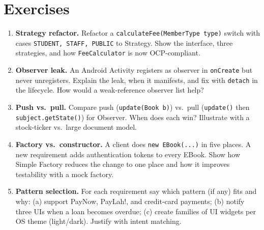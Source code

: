 \section{Exercises}
\label{sec:ch06-exercises}
\begin{enumerate}[label=E6.\arabic*, leftmargin=*, itemsep=0.8em]
    \item \textbf{Strategy refactor.} Refactor a \texttt{calculateFee(MemberType type)} switch with cases \texttt{STUDENT, STAFF, PUBLIC} to Strategy. Show the interface, three strategies, and how \texttt{FeeCalculator} is now OCP-compliant.
    \item \textbf{Observer leak.} An Android Activity registers as observer in \texttt{onCreate} but never unregisters. Explain the leak, when it manifests, and fix with \texttt{detach} in the lifecycle. How would a weak-reference observer list help?
    \item \textbf{Push vs.\ pull.} Compare push (\texttt{update(Book b)}) vs.\ pull (\texttt{update()} then \texttt{subject.getState()}) for Observer. When does each win? Illustrate with a stock-ticker vs.\ large document model.
    \item \textbf{Factory vs.\ constructor.} A client does \texttt{new EBook(...)} in five places. A new requirement adds authentication tokens to every EBook. Show how Simple Factory reduces the change to one place and how it improves testability with a mock factory.
    \item \textbf{Pattern selection.} For each requirement say which pattern (if any) fits and why: (a) support PayNow, PayLah!, and credit-card payments; (b) notify three UIs when a loan becomes overdue; (c) create families of UI widgets per OS theme (light/dark). Justify with intent matching.
\end{enumerate}
